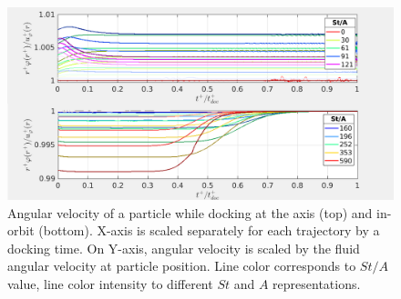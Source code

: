 \documentclass[../main.tex]{subfiles}
\begin{document}
\begin{figure}
\centering
\noindent \includegraphics[width=30pc]{gfx/both_docking_ang_vel.png}
\caption{Angular velocity of a particle while docking at the axis (top) and in-orbit (bottom). X-axis is scaled separately for each trajectory by a docking time. On Y-axis, angular velocity is scaled by the fluid angular velocity at particle position. Line color corresponds to $St/A$ value, line color intensity to different $St$ and $A$ representations.}
\label{fig:ch3_450}
\end{figure}
\end{document}
